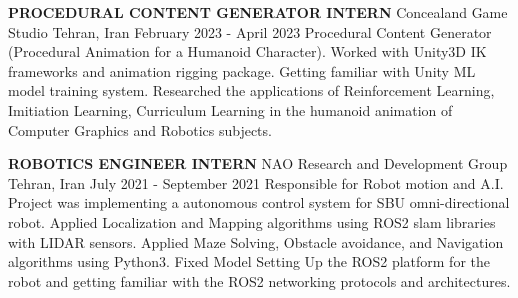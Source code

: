 \begin{cventries}
		
    \cventry
    {\textbf{PROCEDURAL CONTENT GENERATOR INTERN}}
    {Concealand Game Studio}
    {Tehran, Iran}
    {February 2023 - April 2023}
    {Procedural Content Generator (Procedural Animation for a Humanoid Character). \newline Worked with Unity3D IK frameworks and animation rigging package. \newline Getting familiar with Unity ML model training system. \newline Researched the applications of Reinforcement Learning, Imitiation Learning, Curriculum Learning in the humanoid animation of Computer Graphics and Robotics subjects.}   
    
\vspace{0.7 cm}

    \cventry
    {\textbf{ROBOTICS ENGINEER INTERN}}
    {NAO Research and Development Group}
    {Tehran, Iran}
    {July 2021 - September 2021}
    {Responsible for Robot motion and A.I. \newline Project was implementing a autonomous control system for SBU omni-directional robot. Applied Localization and Mapping algorithms using ROS2 slam libraries with LIDAR sensors. \newline Applied Maze Solving, Obstacle avoidance, and Navigation algorithms using Python3. \newline Fixed Model \newline Setting Up the ROS2 platform for the robot and getting familiar with the ROS2 networking protocols and architectures.}   
    
\end{cventries}

